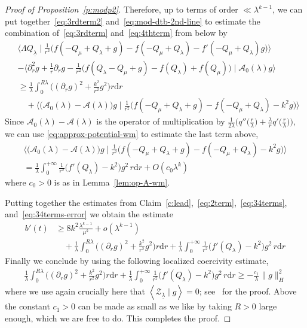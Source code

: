 \documentclass[10pt,reqno]{amsart}
\def\cE {\mathcal{E}}
\newcommand{\wt}[1]{\widetilde{#1}}
\newcommand{\bs}[1]{\boldsymbol{#1}}
\newcommand{\vd}{\mathrm{d}}
\newcommand{\udr}{\,r\vd r}
\newcommand{\uln}[1]{{\underline{ #1 }}}
\newcommand{\A}{\mathcal{A}}
\newcommand{\ZZ}{\mathcal{Z}}
\newcommand{\la}{\lambda}
\newcommand{\ang}[1]{\left\langle{#1}\right\rangle}
\newcommand{\EQ}[1]{\begin{equation}\begin{split} #1 \end{split}\end{equation}}
\numberwithin{equation}{section}
\theoremstyle{remark}
\newcommand{\ula}{\underline{\lambda}}
\newcommand{\ud}{\mathrm{d}}
\newcommand{\0}{\emptyset}
\begin{document}
\begin{proof}[Proof of Proposition~\ref{p:modp2}]
Therefore, up to terms of order $\ll \la^{k-1}$, we can put together~\eqref{eq:3rdterm2} and~\eqref{eq:mod-dtb-2nd-line} to estimate the combination of~\eqref{eq:3rdterm} and~\eqref{eq:4thterm} from below by 
\EQ{ \label{eq:34terms} 
&\Big\langle \Lambda Q_\uln\lambda \mid
\frac{1}{r^2}\big(f({-}Q_\mu + Q_\lambda + g) - f({-}Q_\mu + Q_\lambda) - f'({-}Q_\mu + Q_\lambda)g\big)\Big\rangle \\
&{-} \Big\langle \partial_r^2 g + \frac 1r \partial_r g - \frac{1}{r^2}\big(f(Q_\la- Q_\mu + g) - f(Q_\la) +f(Q_\mu)\big) \mid  \A_0(\lambda)g\Big\rangle  \\
& \ge  \frac{1}{\lambda}\int_0^{R\lambda}\Big((\partial_r g)^2 + \frac{k^2}{r^2}g^2\Big)r\ud r  \\
& \quad +\Big\langle \big(\A_0(\lambda) - \A(\lambda)\big) g \mid \frac{1}{r^2}\big(f({-}Q_\mu + Q_\lambda + g) - f({-}Q_\mu+Q_\lambda)- k^2g\big)\Big\rangle
}
Since $\A_0(\lambda) - \A(\lambda)$ is the operator of multiplication by $\frac{1}{2\lambda} \Big(q''\big(\frac{r}{\lambda}\big) + \frac{\lambda}{r}q'\big(\frac{r}{\lambda}\big)\Big)$,
we can use \eqref{eq:approx-potential-wm} to estimate the last term above, 
\EQ{ \label{eq:34terms-error} 
 \Big\langle \big(\A_0(\lambda) - \A(\lambda)\big) g\mid \frac{1}{r^2}\big(f({-}Q_\mu + Q_\lambda + g) - f({-}Q_\mu+Q_\lambda)- k^2g\big)\Big\rangle   \\ 
 =  \frac{1}{\lambda}\int_0^{+\infty} \frac{1}{r^2}\big(f'(Q_\lambda)-k^2\big)g^2 \udr  + O(c_0 \la^k)
}
where $c_0>0$ is as in Lemma~\ref{lem:op-A-wm}. 

Putting together the estimates from Claim~\ref{c:lead},~\eqref{eq:2term},~\eqref{eq:34terms}, and~\eqref{eq:34terms-error} we obtain the estimate 
\EQ{
b'(t)  &\ge 8k^2 \frac{\la^{k-1}}{\mu^k}  + o(\la^{k-1}) \\
& \quad + \frac{1}{\lambda}\int_0^{R\lambda}\Big((\partial_r g)^2 + \frac{k^2}{r^2}g^2\Big)r\ud r  + \frac{1}{\lambda}\int_0^{+\infty} \frac{1}{r^2}\big(f'(Q_\lambda)-k^2\big)g^2 \udr  
}
Finally we conclude by using the following localized coercivity estimate, 
\EQ{
\frac{1}{\lambda}\int_0^{R\lambda}\Big((\partial_r g)^2 + \frac{k^2}{r^2}g^2\Big)r\ud r  + \frac{1}{\lambda}\int_0^{+\infty} \frac{1}{r^2}\big(f'(Q_\lambda)-k^2\big)g^2 \udr   \ge - \frac{c_1}{\la} \| g\|_H^2  
}
where we use again crucially here that $\ang{ \ZZ_{\ula} \mid g} = 0$; see~\cite[Lemma 5.4, eq. (5.28)]{JJ-AJM} for the proof. Above the constant $c_1>0$ can be made as small as we like by taking $R>0$ large enough, which we are free to do. This completes the proof. 
\end{proof} 
\end{document}
